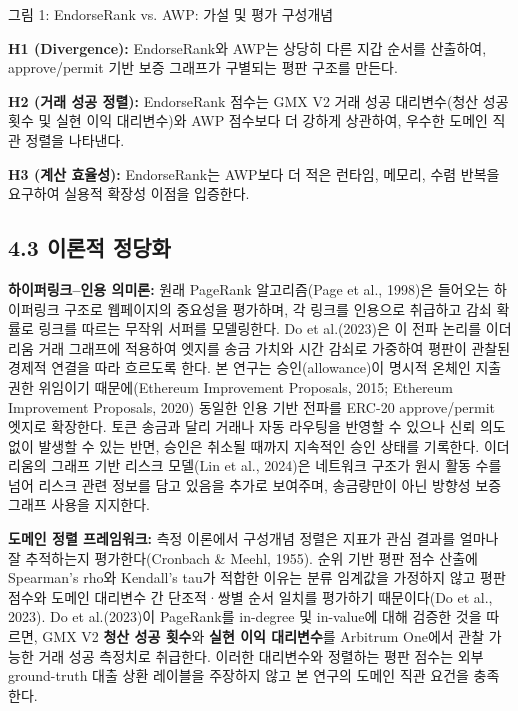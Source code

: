 \begin{center}


\vspace{0.4em}
그림 1: EndorseRank vs. AWP: 가설 및 평가 구성개념
\end{center}

\textbf{H1 (Divergence): }EndorseRank와 AWP는 상당히 다른 지갑 순서를 산출하여, approve/permit 기반 보증 그래프가 구별되는 평판 구조를 만든다.


\textbf{H2 (거래 성공 정렬): }EndorseRank 점수는 GMX V2 거래 성공 대리변수(청산 성공 횟수 및 실현 이익 대리변수)와 AWP 점수보다 더 강하게 상관하여, 우수한 도메인 직관 정렬을 나타낸다.


\textbf{H3 (계산 효율성): }EndorseRank는 AWP보다 더 적은 런타임, 메모리, 수렴 반복을 요구하여 실용적 확장성 이점을 입증한다.


\subsection*{4.3 이론적 정당화}
\label{sec:theoretical-justification}

\textbf{하이퍼링크--인용 의미론: }원래 PageRank 알고리즘(Page et al., 1998)은 들어오는 하이퍼링크 구조로 웹페이지의 중요성을 평가하며, 각 링크를 인용으로 취급하고 감쇠 확률로 링크를 따르는 무작위 서퍼를 모델링한다. Do et al.(2023)은 이 전파 논리를 이더리움 거래 그래프에 적용하여 엣지를 송금 가치와 시간 감쇠로 가중하여 평판이 관찰된 경제적 연결을 따라 흐르도록 한다. 본 연구는 승인(allowance)이 명시적 온체인 지출 권한 위임이기 때문에(Ethereum Improvement Proposals, 2015; Ethereum Improvement Proposals, 2020) 동일한 인용 기반 전파를 ERC-20 approve/permit 엣지로 확장한다. 토큰 송금과 달리 거래나 자동 라우팅을 반영할 수 있으나 신뢰 의도 없이 발생할 수 있는 반면, 승인은 취소될 때까지 지속적인 승인 상태를 기록한다. 이더리움의 그래프 기반 리스크 모델(Lin et al., 2024)은 네트워크 구조가 원시 활동 수를 넘어 리스크 관련 정보를 담고 있음을 추가로 보여주며, 송금량만이 아닌 방향성 보증 그래프 사용을 지지한다.


\textbf{도메인 정렬 프레임워크: }측정 이론에서 구성개념 정렬은 지표가 관심 결과를 얼마나 잘 추적하는지 평가한다(Cronbach \& Meehl, 1955). 순위 기반 평판 점수 산출에 Spearman's rho와 Kendall's tau가 적합한 이유는 분류 임계값을 가정하지 않고 평판 점수와 도메인 대리변수 간 단조적·쌍별 순서 일치를 평가하기 때문이다(Do et al., 2023). Do et al.(2023)이 PageRank를 in-degree 및 in-value에 대해 검증한 것을 따르면, GMX V2 \textbf{청산 성공 횟수}와 \textbf{실현 이익 대리변수}를 Arbitrum One에서 관찰 가능한 거래 성공 측정치로 취급한다. 이러한 대리변수와 정렬하는 평판 점수는 외부 ground-truth 대출 상환 레이블을 주장하지 않고 본 연구의 도메인 직관 요건을 충족한다.


